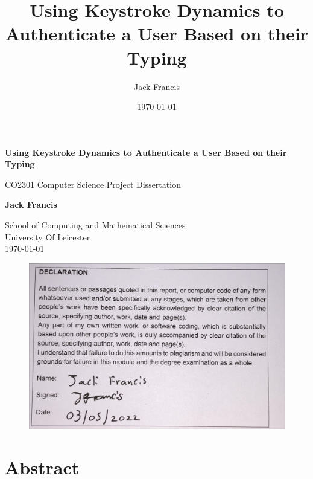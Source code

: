 \documentclass[10pt,a4paper]{report}
\title{Using Keystroke Dynamics to Authenticate a User Based on their Typing}
\author{Jack Francis}
\date{\today}
\begin{document}
\begin{titlepage}
    \begin{center}
        \vspace*{1cm}
            
        \Huge
        \textbf{Using Keystroke Dynamics to Authenticate a User Based on their Typing}
            
        \vspace{0.5cm}
        \LARGE
        CO2301 Computer Science Project Dissertation
            
        \vspace{1.5cm}
            
        \textbf{Jack Francis}
            
        \vfill
            
        \vspace{0.8cm}
            
        \Large
        School of Computing and Mathematical Sciences\\
        University Of Leicester\\
        \today
            
    \end{center}
\end{titlepage}

\newpage

\begin{figure}
	\centering
	\includegraphics[scale=0.15]{PlagDec}
\end{figure}


\chapter*{Abstract}
\end{document}
